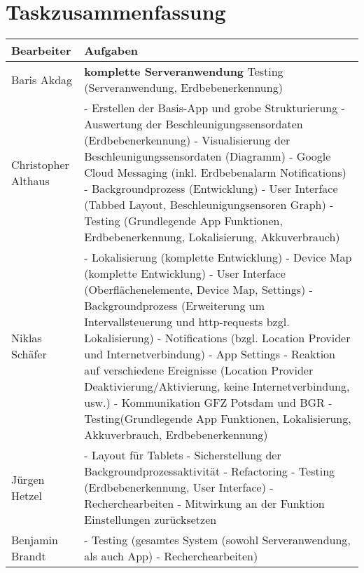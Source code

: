 \documentclass[10pt,a4paper]{article}
\begin{document}
\section{Taskzusammenfassung}
\begin{tabular}{ | l | p{11cm} |}
	\hline
	\textbf{Bearbeiter} & \textbf{Aufgaben}\\    
	\hline
	Baris Akdag & 	\textbf{komplette Serveranwendung}
					\newline Testing (Serveranwendung, Erdbebenerkennung)		\\
	\hline	
	Christopher Althaus & 	- Erstellen der Basis-App und grobe Strukturierung\newline
							- Auswertung der Beschleunigungssensordaten (Erdbebenerkennung)\newline 
							- Visualisierung der Beschleunigungssensordaten (Diagramm)\newline
							- Google Cloud Messaging (inkl. Erdbebenalarm Notifications)\newline 
							- 	Backgroundprozess (Entwicklung)\newline 
							- 	User Interface (Tabbed Layout, Beschleunigungsensoren Graph)\newline 
							- 	Testing (Grundlegende App Funktionen, Erdbebenerkennung, Lokalisierung, Akkuverbrauch)\\    
    \hline
	Niklas Schäfer & 		- 	Lokalisierung (komplette Entwicklung)\newline 
							- 	Device Map (komplette Entwicklung)\newline 
							- 	User Interface (Oberflächenelemente, Device Map, Settings)\newline 
							- 	Backgroundprozess (Erweiterung um Intervallsteuerung und http-requests bzgl. Lokalisierung)\newline 
							- 	Notifications (bzgl. Location Provider und Internetverbindung)\newline 
							- 	App Settings\newline 
							- 	Reaktion auf verschiedene Ereignisse (Location Provider Deaktivierung/Aktivierung, keine Internetverbindung, usw.)\newline 
							- 	Kommunikation GFZ Potsdam und BGR\newline 
							- 	Testing(Grundlegende App Funktionen, Lokalisierung, Akkuverbrauch, Erdbebenerkennung) \\
	\hline	
	Jürgen Hetzel & 			- 	Layout für Tablets\newline 
							- 	Sicherstellung der Backgroundprozessaktivität\newline 
							- 	Refactoring\newline 
							- 	Testing (Erdbebenerkennung, User Interface)\newline 
							- 	Recherchearbeiten\newline
							-	Mitwirkung an der Funktion \glqq Einstellungen zurücksetzen\grqq\\
	\hline	
	Benjamin Brandt & 		- Testing (gesamtes System (sowohl Serveranwendung, als auch App)\newline 
							- Recherchearbeiten)	\\
	\hline	
\end{tabular}
\end{document}
